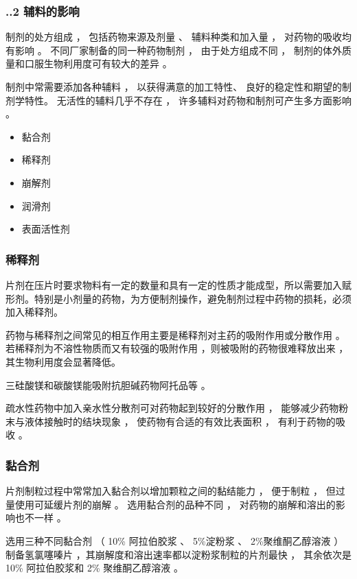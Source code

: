 \begin{frame}
    \frametitle{\thesection.\thesubsection.2 辅料的影响}
    制剂的处方组成 ， 包括药物来源及剂量 、 辅料种类和加入量 ， 对药物的吸收均有影响 。 不同厂家制备的同一种药物制剂 ， 由于处方组成不同 ， 制剂的体外质量和口服生物利用度可有较大的差异 。
    
    制剂中常需要添加各种辅料 ， 以获得满意的加工特性、 良好的稳定性和期望的制剂学特性。 无活性的辅料几乎不存在 ， 许多辅料对药物和制剂可产生多方面影响 。
    \begin{itemize}
      \item 黏合剂
      \item 稀释剂
      \item 崩解剂
      \item 润滑剂
      \item 表面活性剂
    \end{itemize}

\end{frame}


\begin{frame}
    \frametitle{稀释剂}
    片剂在压片时要求物料有一定的数量和具有一定的性质才能成型，所以需要加入赋形剂。特别是小剂量的药物，为方便制剂操作，避免制剂过程中药物的损耗，必须加入稀释剂。

    药物与稀释剂之间常见的相互作用主要是稀释剂对主药的吸附作用或分散作用 。 若稀释剂为不溶性物质而又有较强的吸附作用 ，则被吸附的药物很难释放出来 ， 其生物利用度会显著降低。
    \begin{blankblock}{}
        三硅酸镁和碳酸镁能吸附抗胆碱药物阿托品等 。 
        
        疏水性药物中加入亲水性分散剂可对药物起到较好的分散作用 ， 能够减少药物粉末与液体接触时的结块现象 ， 使药物有合适的有效比表面积 ， 有利于药物的吸收 。
    \end{blankblock} 
\end{frame}


\begin{frame}
    \frametitle{黏合剂}
    片剂制粒过程中常常加入黏合剂以增加颗粒之间的黏结能力 ， 便于制粒 ， 但过量使用可延缓片剂的崩解 。 选用黏合剂的品种不同 ， 对药物的崩解和溶出的影响也不一样 。 
    \begin{blankblock}{}
        选用三种不同黏合剂 （ 10\% 阿拉伯胶浆 、 5\%淀粉浆 、 2\%聚维酮乙醇溶液 ） 制备氢氯噻嗪片 ，其崩解度和溶出速率都以淀粉浆制粒的片剂最快 ， 其余依次是 10\% 阿拉伯胶浆和 2\% 聚维酮乙醇溶液 。
    \end{blankblock}

\end{frame}



